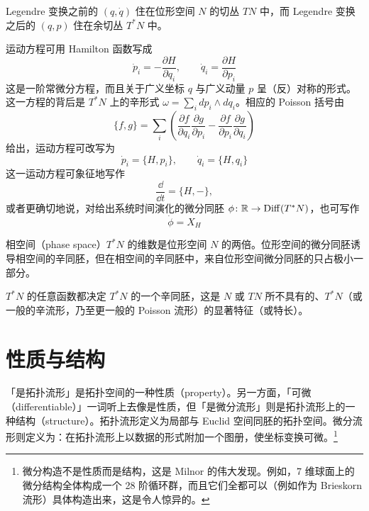 
Legendre 变换之前的 $(q,\dot q)$ 住在位形空间 $N$ 的切丛 $TN$ 中，而 Legendre 变换之后的 $(q,p)$ 住在余切丛 $T^*N$ 中。

运动方程可用 Hamilton 函数写成
\begin{equation}
    \dot p_i = -\frac{\partial H}{\partial q_i},\qquad
    \dot q_i = \frac{\partial H}{\partial p_i} \tag{3.5}
\end{equation}
这是一阶常微分方程，而且关于广义坐标 $q$ 与广义动量 $p$ 呈（反）对称的形式。这一方程的背后是 $T^*N$ 上的辛形式 $\omega=\sum_i dp_i\wedge dq_i$。相应的 Poisson 括号由
\begin{equation}
    \{f,g\}=\sum_i\left(\frac{\partial f}{\partial q_i}\frac{\partial g}{\partial p_i}-\frac{\partial f}{\partial p_i}\frac{\partial g}{\partial q_i}\right) \tag{3.6}
\end{equation}
给出，运动方程可改写为
\begin{equation}
    \dot p_i=\{H,p_i\},\qquad \dot q_i=\{H,q_i\} \tag{3.7}
\end{equation}
这一运动方程可象征地写作
\begin{equation}
    \frac{\dd}{\dd t}=\{H,-\}, \tag{3.8}
\end{equation}
或者更确切地说，对给出系统时间演化的微分同胚 $\phi\colon\mathbb{R}\to\mathrm{Diff}(T^*N)$，也可写作
\begin{equation}
    \dot\phi=X_H \tag{3.9}
\end{equation}

相空间（phase space）$T^*N$ 的维数是位形空间 $N$ 的两倍。位形空间的微分同胚诱导相空间的辛同胚，但在相空间的辛同胚中，来自位形空间微分同胚的只占极小一部分。

$T^*N$ 的任意函数都决定 $T^*N$ 的一个辛同胚，这是 $N$ 或 $TN$ 所不具有的、$T^*N$（或一般的辛流形，乃至更一般的 Poisson 流形）的显著特征（或特长）。

\section{性质与结构}

「是拓扑流形」是拓扑空间的一种性质（property）。另一方面，「可微（differentiable）」一词听上去像是性质，但「是微分流形」则是拓扑流形上的一种结构（structure）。拓扑流形定义为局部与 Euclid 空间同胚的拓扑空间。微分流形则定义为：在拓扑流形上以数据的形式附加一个图册，使坐标变换可微。\footnote{微分构造不是性质而是结构，这是 Milnor 的伟大发现。例如，7 维球面上的微分结构全体构成一个 28 阶循环群，而且它们全都可以（例如作为 Brieskorn 流形）具体构造出来，这是令人惊异的。}

